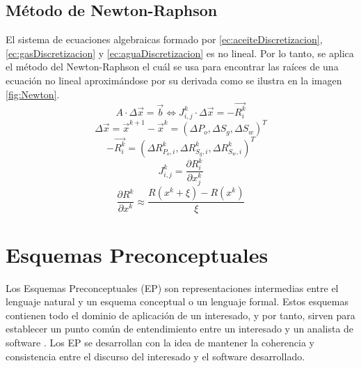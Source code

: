 \subsection{Método de Newton-Raphson}
%
El sistema de ecuaciones algebraicas formado por \ref{ec:aceiteDiscretizacion}, \ref{ec:gasDiscretizacion} y \ref{ec:aguaDiscretizacion} es no lineal. Por lo tanto, se aplica el método del Newton-Raphson el cuál se usa para encontrar las raíces de una ecuación no lineal aproximándose por su derivada como se ilustra en la imagen \ref{fig:Newton}.
\begin{equation}
A \cdot {\Delta \vec{x}} = \vec{b} \Leftrightarrow J^{k}_{i,j} \cdot {\Delta \vec{x}} = -\vec{R^{k}_{i}}
\end{equation}
\begin{equation}
\Delta \vec{x} = \vec{x}^{k+1} - \vec{x}^{k} = \left(\Delta P_o, \Delta S_g, \Delta S_w \right)^T
\end{equation}
\begin{equation}
-\vec{R^k_i} = \left(\Delta R^k_{P_o,i}, \Delta R^k_{S_g,i}, \Delta R^k_{S_w,i} \right)^T
\end{equation}
\begin{equation}
J^k_{i,j}=\frac{\partial R^k_i}{\partial x^k_j}	
\end{equation}
\begin{equation}
\frac{\partial R^k}{\partial x^k} \approx \frac{R\left(x^k + \xi \right) - R\left(x^k \right)}{\xi}
\end{equation}


\section{Esquemas Preconceptuales}

Los Esquemas Preconceptuales (EP) son representaciones intermedias entre el lenguaje natural y un esquema conceptual o un lenguaje formal. Estos esquemas contienen todo el dominio de aplicación de un interesado, y por tanto, sirven para establecer un punto común de entendimiento entre un interesado y un analista de software \citep{zapata2007phd}. Los EP se desarrollan con la idea de mantener la coherencia y consistencia entre el discurso del interesado y el software desarrollado. 

